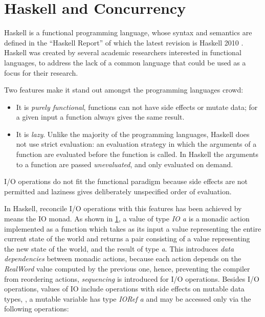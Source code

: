 
\chapter{Haskell and Concurrency}

Haskell is a functional programming language, whose syntax and semantics are defined in the ``Haskell Report'' of which the latest revision is Haskell 2010 \cite{Marlow_haskell2010}. Haskell was created by several academic researchers interested in functional languages, to address the lack of a common language that could be used as a focus for their research.

Two features make it stand out amongst the programming languages crowd:
\begin{itemize}
\item It is \emph{purely functional}, \ie functions can not have side effects or mutate data; for a given input a function always gives the same result.
\item It is \emph{lazy}. Unlike the majority of the programming languages, Haskell does not use strict evaluation: an evaluation strategy in which the arguments of a function are evaluated before the function is called. In Haskell the arguments to a function are passed \emph{unevaluated}, and only evaluated on demand.
\end{itemize}

I/O operations do not fit the functional paradigm because side effects are not permitted and laziness gives deliberately unspecified order of evaluation.

In Haskell, reconcile I/O operations with this features has been achieved by means the IO monad.\cite{PeytonJones:1993:IFP:158511.158524}
As shown in \cref{}, a value of type \emph{IO a} is a monadic action implemented as a function which takes as its input a value representing the entire current state of the world and returns a pair consisting of a value representing the new state of the world, and the result of type \emph{a}.
This introduces \emph{data dependencies} between monadic actions, because each action depends on the \emph{RealWord} value computed by the previous one, hence, preventing the compiler from reordering actions, \emph{sequencing} is introduced for I/O operations.
Besides I/O operations, values of IO include operations with side effects on mutable data types, \eg, a mutable variable has type \emph{IORef a} and may be accessed only via the following operations:


